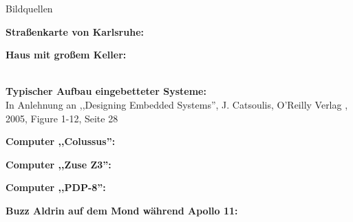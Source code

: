 {\begin{frame}[allowframebreaks]{Bildquellen}
        \begin{minipage}{\textwidth}
            \textbf{Straßenkarte von Karlsruhe:} \\
        \end{minipage}
        \medskip

        \begin{minipage}{\textwidth}
            \textbf{Haus mit großem Keller:} \\
             \\
        \end{minipage}
        \medskip

        \begin{minipage}{\textwidth}
            \textbf{Typischer Aufbau eingebetteter Systeme:} \\
            In Anlehnung an ,,Designing Embedded Systems'', J. Catsoulis, O'Reilly Verlag , 2005, Figure 1-12, Seite 28
        \end{minipage}
        \medskip

        \begin{minipage}{\textwidth}
            \textbf{Computer ,,Colussus'':} \\
        \end{minipage}
        \medskip

        \begin{minipage}{\textwidth}
            \textbf{Computer ,,Zuse Z3'':} \\
        \end{minipage}
        \medskip

        \begin{minipage}{\textwidth}
            \textbf{Computer ,,PDP-8'':} \\
        \end{minipage}
        \medskip

        \begin{minipage}{\textwidth}
            \textbf{Buzz Aldrin auf dem Mond während Apollo 11:} \\
        \end{minipage}
        \medskip


\end{frame}}
